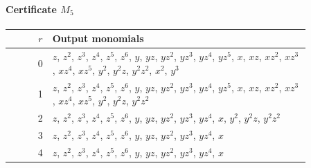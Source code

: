 \documentclass[11pt]{amsart}
\theoremstyle{definition}
\theoremstyle{remark}
\numberwithin{equation}{section}
\begin{document}
\paragraph*{Certificate $M_5$}
\begin{center}
\begin{tabular}{rp{0.86\linewidth}}
$r$ & Output monomials\\\hline
0 & \(z\), \(z^{2}\), \(z^{3}\), \(z^{4}\), \(z^{5}\), \(z^{6}\), \(y\), \(yz\), \(yz^{2}\), \(yz^{3}\), \(yz^{4}\), \(yz^{5}\), \(x\), \(xz\), \(xz^{2}\), \(xz^{3}\), \(xz^{4}\), \(xz^{5}\), \(y^{2}\), \(y^{2}z\), \(y^{2}z^{2}\), \(x^{2}\), \(y^{3}\)\\
1 & \(z\), \(z^{2}\), \(z^{3}\), \(z^{4}\), \(z^{5}\), \(z^{6}\), \(y\), \(yz\), \(yz^{2}\), \(yz^{3}\), \(yz^{4}\), \(yz^{5}\), \(x\), \(xz\), \(xz^{2}\), \(xz^{3}\), \(xz^{4}\), \(xz^{5}\), \(y^{2}\), \(y^{2}z\), \(y^{2}z^{2}\)\\
2 & \(z\), \(z^{2}\), \(z^{3}\), \(z^{4}\), \(z^{5}\), \(z^{6}\), \(y\), \(yz\), \(yz^{2}\), \(yz^{3}\), \(yz^{4}\), \(x\), \(y^{2}\), \(y^{2}z\), \(y^{2}z^{2}\)\\
3 & \(z\), \(z^{2}\), \(z^{3}\), \(z^{4}\), \(z^{5}\), \(z^{6}\), \(y\), \(yz\), \(yz^{2}\), \(yz^{3}\), \(yz^{4}\), \(x\)\\
4 & \(z\), \(z^{2}\), \(z^{3}\), \(z^{4}\), \(z^{5}\), \(z^{6}\), \(y\), \(yz\), \(yz^{2}\), \(yz^{3}\), \(yz^{4}\), \(x\)\\
\end{tabular}
\end{center}
\end{document}
